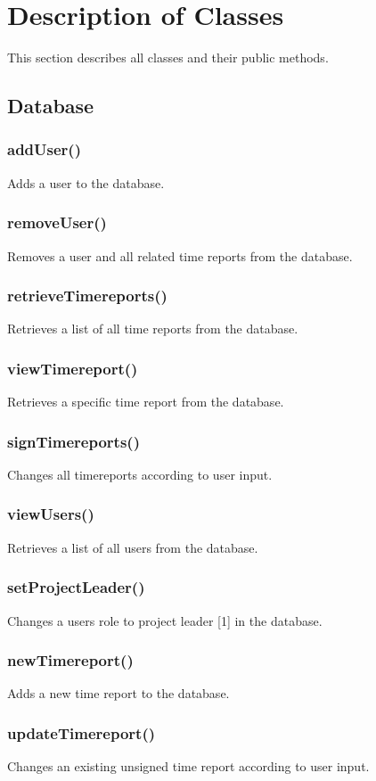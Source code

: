 \documentclass{article}
\begin{document}
\section{Description of Classes}
This section describes all classes and their public methods.

\subsection{Database}
\subsubsection{addUser()}
Adds a user to the database.
\subsubsection{removeUser()}
Removes a user and all related time reports from the database.
\subsubsection{retrieveTimereports()}
Retrieves a list of all time reports from the database.
\subsubsection{viewTimereport()}
Retrieves a specific time report from the database.
\subsubsection{signTimereports()}
Changes all timereports according to user input.
\subsubsection{viewUsers()}
Retrieves a list of all users from the database.
\subsubsection{setProjectLeader()}
Changes a users role to project leader [1] in the database.
\subsubsection{newTimereport()}
Adds a new time report to the database.
\subsubsection{updateTimereport()}
Changes an existing unsigned time report according to user input.
\end{document}
